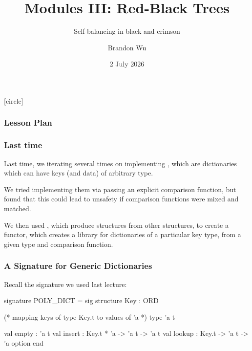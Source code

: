 \documentclass[aspectratio=169, handout]{beamer}
\title{Modules III: Red-Black Trees} %
\subtitle{Self-balancing in black and crimson} %
\date{2 July 2026} %
\author{Brandon Wu} %
\newif\ifcolorlambda
\begin{document}
\ifweb
    \renewcommand{\pause}{}
\fi

[circle]

{
\begin{frame}[plain]
    \colorlambdatrue
    \titlepage
\end{frame}
}


\begin{frame}[fragile]
  \frametitle{Lesson Plan}

  \tableofcontents
\end{frame}

\begin{frame}[fragile]
  \frametitle{Last time}

  Last time, we iterating several times on implementing ,
  which are dictionaries which can have keys (and data) of arbitrary type.

  \pause
  \vspace{\fill}

  We tried implementing them via passing an explicit comparison function, but found
  that this could lead to unsafety if comparison functions were mixed and matched.

  \pause
  \vspace{\fill}

  We then used , which produce structures from other structures, to
  create a  functor, which creates a library for dictionaries of a
  particular key type, from a given type and comparison function.
\end{frame}


\begin{frame}[fragile]
  \frametitle{A Signature for Generic Dictionaries}

  Recall the  signature we used last lecture:

  \begin{codeblock}
    signature POLY_DICT =
      sig
        structure Key : ORD

        (* mapping keys of type Key.t to values of 'a *)
        type 'a t

        val empty : 'a t
        val insert : Key.t * 'a -> 'a t -> 'a t
        val lookup : Key.t -> 'a t -> 'a option
      end
  \end{codeblock}
\end{frame}
\end{document}

